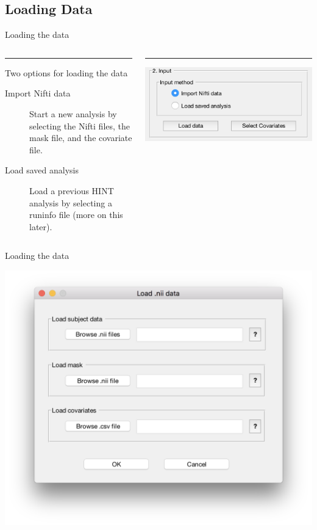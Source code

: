 \documentclass[11pt]{beamer}
\begin{document}
\subsection{Loading Data}
\begin{frame}{Loading the data}
\begin{columns}[T] %
	\begin{column}{.6\textwidth}
		\color{black}\rule{\linewidth}{0pt}
		
Two options for loading the data

\begin{description}
\item[Import Nifti data] Start a new analysis by selecting the Nifti files, the mask file, and the covariate file.
\item[Load saved analysis] Load a previous HINT analysis by selecting a runinfo file (more on this later).
\end{description}
		
	\end{column}%
	\hfill%
	\begin{column}{.3\textwidth}
		\color{blue}\rule{\linewidth}{0pt}
		\includegraphics[width=1\linewidth]{figs/subpanelinput}
	\end{column}%
\end{columns}
\end{frame}

\begin{frame}{Loading the data}

\includegraphics[width=1\linewidth]{figs/inputNIFTI}

\end{frame}
\end{document}

